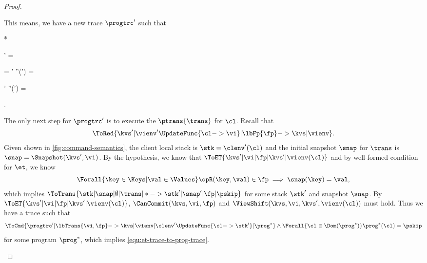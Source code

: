 \begin{proof}
\begin{enumerate}
\begin{enumerate}
        This means, we have a new trace \( \progtrc' \) such that
        \begin{Formulae}*
        \begin{Formula}
            \progtrc' = 
            \\ {} \land {} 
            \begin{Bracketed} \cl = \cl' \implies \prog''(\cl') = \ptrans{\trans} \end{Bracketed}
            \land \begin{Bracketed} \cl \neq \cl' \implies \prog''(\cl') = \pskip \end{Bracketed} .
        \end{Formula}
        \end{Formulae}
        The only next step for \( \progtrc' \) is to execute the \( \ptrans{\trans} \) for \( \cl \).
        Recall that \[ \ToRed{ \kvs' | \vienv'\UpdateFunc{\cl -> \vi} | \lbFp{\fp} -> \kvs | \vienv }. \]
        Given \rCAtomicTrans shown in \cref{fig:command-semantics}, 
        the client local stack is \( \stk = \clenv'(\cl)\) and the initial snapshot \( \snap \) for 
        \( \trans \) is \( \snap =  \Snapshot(\kvs', \vi) \).
        By the hypothesis, we know that \( \ToET{\kvs' | \vi | \fp | \kvs' | \vienv(\cl) }  \)
        and by well-formed condition for \( \et \), we know
        \[
        \Forall{\key \in \Keys | \val \in \Values } \opR(\key,\val) \in \fp \implies \snap(\key) = \val ,
        \]
        which implies 
        \( \ToTrans{\stk | \snap | \emptyset | \trans  | * -> \stk' | \snap' | \fp | \pskip } \)
        for some stack \( \stk' \) and snapshot \( \snap \).
        By \( \ToET{\kvs' | \vi | \fp | \kvs' | \vienv(\cl) } \),
        \( \CanCommit(\kvs,\vi,\fp)\) and \( \ViewShift(\kvs,\vi,\kvs',\vienv(\cl)) \) must hold.
        Thus we have a trace such that 
        \[
         \ToCmd{\progtrc' | \lbTrans{\vi,\fp} -> \kvs | \vienv | \clenv'\UpdateFunc{\cl -> \stk'} | \prog^* }
        \land \Forall{\cl \in \Dom(\prog^*)} \prog^*(\cl) = \pskip
        \]
        for some program \( \prog^* \), which implies \cref{equ:et-trace-to-prog-trace}. \qedhere
    \end{enumerate}
\end{enumerate}
\end{proof}
